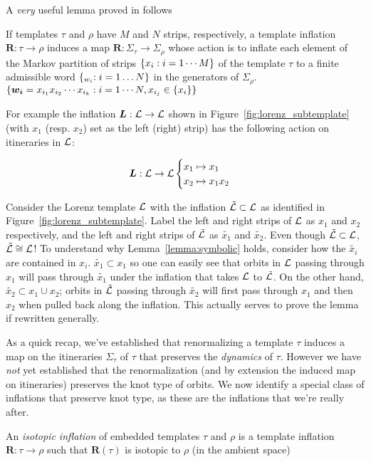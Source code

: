 \documentclass[main.tex]{subfiles}
\begin{document}
A \emph{very} useful lemma proved in \cite{knottyode} follows


\begin{lemma}
  If templates $\tau$ and $\rho$ have $M$ and $N$ strips, respectively, a template inflation $\bm{R}: \tau \to \rho$ induces a map $\bm{R}: \Sigma_\tau \to \Sigma_\rho$ whose action is to inflate each element of the Markov partition of strips $\{ x_i : i = 1\cdots M \}$ of the template $\tau$ to a finite
  admissible word $\{ \bm_{w_i}: i = 1 \dots N \}$ in the generators of $\Sigma_\rho$.  $\{ \bm{w_i} = x_{i_1} x_{i_2} \cdots x_{i_k} : i = 1 \cdots N, x_{i_j} \in \{ x_i \} \}$\label{lemma:symbolic}
\end{lemma}



For example the inflation $\bm{L} : \mathcal{L} \to \mathcal{L}$ shown in Figure~\ref{fig:lorenz_subtemplate} (with $x_1$ (resp. $x_2$) set as the left (right) strip) has the following action on itineraries in $\mathcal{L}$:

\begin{equation}
\bm{L} : \mathcal{L} \to \mathcal{L}  \begin{cases} x_1 \mapsto x_1 \\ x_2 \mapsto x_1 x_2 \end{cases}
\end{equation}

Consider the Lorenz template $\mathcal{L}$ with the inflation $\tilde{\mathcal{L}} \subset \mathcal{L}$ as identified in Figure~\ref{fig:lorenz_subtemplate}.
Label the left and right strips of $\mathcal{L}$ as $x_1$ and $x_2$ respectively, and the left and right strips of $\tilde{\mathcal{L}}$ as $\tilde{x_1}$ and $\tilde{x_2}$.
Even though $\tilde{\mathcal{L}} \subset \mathcal{L}$, $\tilde{\mathcal{L}} \cong \mathcal{L}$! To understand why Lemma~\ref{lemma:symbolic} holds, consider how the $\tilde{x_i}$ are contained in $x_i$. $\tilde{x_1} \subset x_1$ so one can easily see that
orbits in $\mathcal{L}$ passing through $x_1$ will pass through $\tilde{x_1}$ under the inflation that takes $\mathcal{L}$ to $\tilde{\mathcal{L}}$. On the other hand, $\tilde{x_2} \subset x_1 \cup x_2$; orbits in $\tilde{\mathcal{L}}$ passing through
$\tilde{x_2}$ will first pass through $x_1$ and then $x_2$ when pulled back along the inflation. This actually serves to prove the lemma if rewritten generally.

As a quick recap, we've established that renormalizing a template $\tau$ induces a map on the itineraries $\Sigma_\tau$ of $\tau$ that preserves the \emph{dynamics} of $\tau$. However we have \emph{not} yet established
that the renormalization (and by extension the induced map on itineraries)  preserves the knot type of orbits. We now identify a special class of inflations that preserve knot type, as these are the inflations that we're really after.

\begin{definition}
  An \emph{isotopic inflation} of embedded templates $\tau$ and $\rho$ is a template inflation $\bm{R}: \tau \to \rho$ such that $\bm{R}(\tau)$ is isotopic to $\rho$ (in the ambient space)
\end{definition}
\end{document}
